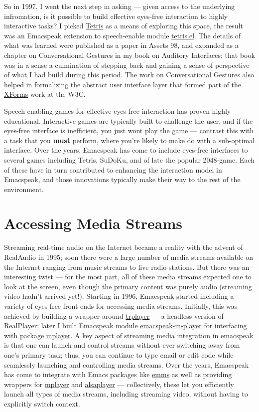 \documentclass[11pt]{article}
\begin{document}
So in 1997, I went the next step in asking — given access to the
underlying infromation, is it possible to build effective
eyes-free interaction to highly interactive tasks? I picked
\uline{Tetris} as a means of exploring this space, the result was an
Emacspeak extension to speech-enable module \uline{tetris.el}. The
details of what was learned were published as a paper in Assets
98, and expanded as a chapter on Conversational Gestures in my
book on Auditory Interfaces; that book was in a sense a
culmination of stepping back and gaining a sense of perspective
of what I had build during this period. The work on
Conversational Gestures also helped in formalizing the abstract
user interface layer that formed part of the
\href{http://www.w3.org/MarkUp/Forms/}{XForms} work at the W3C.

Speech-enabling games for effective eyes-free interaction has
proven highly educational. Interactive games are typically built
to challenge the user, and if the eyes-free interface is
inefficient, you just wont play the game — contrast this with a
task that you \textbf{must} perform, where you're likely to make do with
a sub-optimal interface. Over the years, Emacspeak has come to
include eyes-free interfaces to several games including Tetris,
SuDoKu, and of late the popular 2048-game. Each of these have in
turn contributed to enhancing the interaction model in Emacspeak,
and those innovations typically make their way to the rest of the
environment.


\section{Accessing Media Streams}
\label{sec-10}

Streaming real-time audio on the Internet became a reality with
the advent of RealAudio in 1995; soon there were a large number
of media streams available on the Internet ranging from music
streams to live radio stations. But there was an interesting
twist — for the most part, all of these media streams expected
one to look at the screen, even though the primary content was
purely audio (streaming video hadn't arrived yet!). Starting in
1996, Emacspeak started including a variety of eyes-free
front-ends for accessing media streams. Initially, this was
achieved by building a wrapper around \uline{trplayer} — a headless
version of RealPlayer; later I built Emacspeak module
\uline{emacspeak-m-player} for interfacing with package \uline{mplayer}. A
key aspect of streaming media integration in emacspeak is that
one can launch and control streams without ever switching away
from one's primary task; thus, you can continue to type email or
edit code while seamlessly launching and controlling media
streams. Over the years, Emacspeak has come to integrate with
Emacs packages like \uline{emms} as well as providing wrappers for
\uline{mplayer} and \uline{alsaplayer} — collectively, these let you
efficiently launch all types of media streams, including
streaming video, without having to explicitly switch context.
\end{document}
